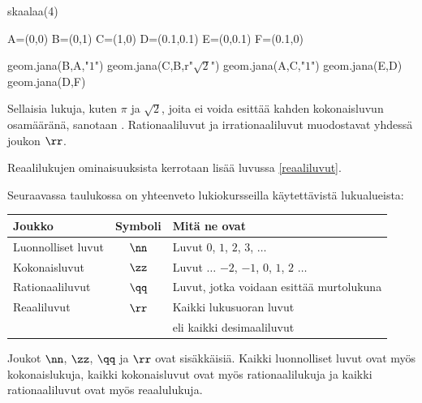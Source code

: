 \begin{kuva}
	skaalaa(4)

	A=(0,0)
	B=(0,1)
	C=(1,0)
	D=(0.1,0.1)
	E=(0,0.1)
	F=(0.1,0)

	geom.jana(B,A,"$1$")
	geom.jana(C,B,r"$\sqrt{2}$")
	geom.jana(A,C,"$1$")
	geom.jana(E,D)
	geom.jana(D,F)
\end{kuva}

Sellaisia lukuja, kuten $\pi$ ja $\sqrt{2}$, joita ei voida esittää kahden kokonaisluvun osamääränä,
sanotaan . Rationaaliluvut ja irrationaaliluvut muodostavat
yhdessä  joukon $\rr$.

Reaalilukujen ominaisuuksista kerrotaan lisää luvussa \ref{reaaliluvut}.

Seuraavassa taulukossa on yhteenveto lukiokursseilla käytettävistä lukualueista:
\begin{center}\begin{tabular}{l|c|l}
Joukko & Symboli & Mitä ne ovat\\
\hline
Luonnolliset luvut & $\nn$ &
Luvut $0$, $1$, $2$, $3$, $\ldots$ \\
Kokonaisluvut & $\zz$ & Luvut $\ldots$ $-2$, $-1$, $0$, $1$, $2$ $\ldots$ \\ 
Rationaaliluvut & $\qq$ & Luvut, jotka voidaan esittää
murtolukuna \\
Reaaliluvut & $\rr$ & Kaikki lukusuoran luvut \\
& & eli kaikki desimaaliluvut
\end{tabular} \end{center} 

Joukot $\nn$, $\zz$, $\qq$ ja $\rr$ ovat sisäkkäisiä. Kaikki luonnolliset luvut ovat myös kokonaislukuja,
kaikki kokonaisluvut ovat myös rationaalilukuja ja kaikki rationaaliluvut ovat myös reaalulukuja.

